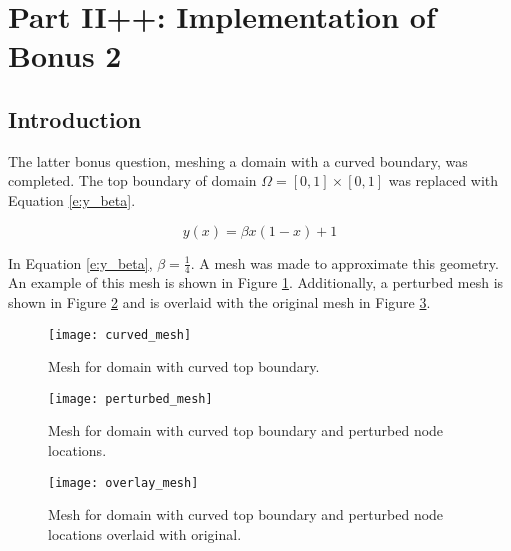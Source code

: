 \documentclass[a4paper, 12pt]{article}
\title{}
\begin{document}
\section*{Part II++: Implementation of Bonus 2}
\subsection{Introduction}\label{sec:intro}
The latter bonus question, meshing a domain with a curved 
boundary, was completed. 
The top boundary of domain $\Omega = [0,1] \times [0,1]$
was replaced with Equation \eqref{e:y_beta}.

\begin{equation} \label{e:y_beta}
y(x) = \beta x ( 1 - x) +1
\end{equation}

In Equation \eqref{e:y_beta}, $\beta = \frac{1}{4}$. 
A mesh was made to approximate this geometry.
An example of this mesh is shown in Figure \ref{fig:mesh}.
Additionally, a perturbed mesh is shown 
in Figure \ref{fig:pMesh} and is overlaid with
the original mesh in Figure \ref{fig:overlap}.

\begin{figure}[H]
  \centering
  \texttt{[image: curved\_mesh]}
  \caption{ Mesh for domain with curved top boundary.}
  \label{fig:mesh}
\end{figure}

\begin{figure}[H]
  \centering
  \texttt{[image: perturbed\_mesh]}
  \caption{ Mesh for domain with curved top boundary 
            and perturbed node locations.}
  \label{fig:pMesh}
\end{figure}

\begin{figure}[H]
  \centering
  \texttt{[image: overlay\_mesh]}
  \caption{ Mesh for domain with curved top boundary 
            and perturbed node locations overlaid
            with original.}
  \label{fig:overlap}
\end{figure}


\end{document}
